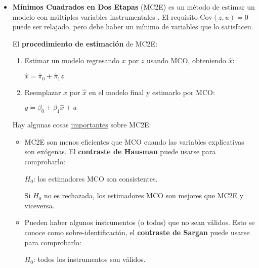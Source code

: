 \documentclass[10pt, a4paper, landscape]{article}
\newcommand{\Cov}{\mathrm{Cov}}
\begin{document}
\begin{multicols}{3}
		\begin{itemize}[leftmargin=*]
			\item \textbf{Mínimos Cuadrados en Dos Etapas} (MC2E) es un método de estimar un modelo con múltiples variables instrumentales . El requisito $\Cov(z, u) = 0$ puede ser relajado, pero debe haber un mínimo de variables que lo satisfacen.
			
			El \textbf{procedimiento de estimación} de MC2E:
			
			\begin{enumerate}[leftmargin=*]
				\item Estimar un modelo regresando $x$ por $z$ usando MCO, obteniendo $\hat{x}$:
				
				\begin{center}
					$\hat{x} = \hat{\pi}_{0} + \hat{\pi}_{1} z$
				\end{center}
				
				\item Reemplazar $x$ por $\hat{x}$ en el modelo final y estimarlo por MCO:
				
				\begin{center}
					$y = \beta_{0} + \beta_{1} \hat{x}+ u$
				\end{center}
			\end{enumerate}
			
			Hay algunas cosas \underline{importantes} sobre MC2E:
			
			\begin{itemize}[leftmargin=*]
				\item MC2E son menos eficientes que MCO cuando las variables explicativas son exógenas. El \textbf{contraste de Hausman} puede usarse para comprobarlo:
				
				\begin{center}
					$H_{0}$: los estimadores MCO son consistentes.
				\end{center}
				
				Si $H_{0}$ no es rechazada, los estimadores MCO son mejores que MC2E y viceversa.
				
				\item Pueden haber algunos instrumentos (o todos) que no sean válidos. Esto se conoce como sobre-identificación, el \textbf{contraste de Sargan} puede usarse para comprobarlo:
				
				\begin{center}
					$H_{0}$: todos los instrumentos son válidos.
				\end{center}
			\end{itemize}
		\end{itemize}
		

\end{multicols}
\end{document}
